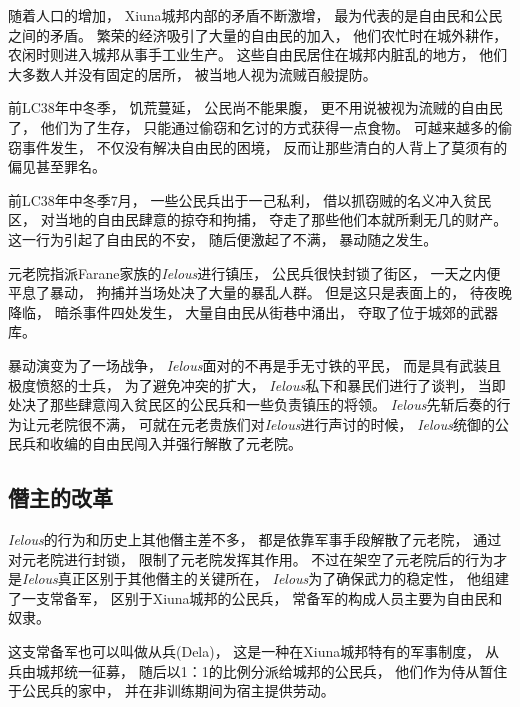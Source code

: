 \documentclass[12pt, a4paper]{ctexart}
\begin{document}
        随着人口的增加，
        Xiuna城邦内部的矛盾不断激增，
        最为代表的是自由民和公民之间的矛盾。
        繁荣的经济吸引了大量的自由民的加入，
        他们农忙时在城外耕作，
        农闲时则进入城邦从事手工业生产。
        这些自由民居住在城邦内脏乱的地方，
        他们大多数人并没有固定的居所，
        被当地人视为流贼百般提防。

        前LC38年中冬季，
        饥荒蔓延，
        公民尚不能果腹，
        更不用说被视为流贼的自由民了，
        他们为了生存，
        只能通过偷窃和乞讨的方式获得一点食物。
        可越来越多的偷窃事件发生，
        不仅没有解决自由民的困境，
        反而让那些清白的人背上了莫须有的偏见甚至罪名。

        前LC38年中冬季7月，
        一些公民兵出于一己私利，
        借以抓窃贼的名义冲入贫民区，
        对当地的自由民肆意的掠夺和拘捕，
        夺走了那些他们本就所剩无几的财产。
        这一行为引起了自由民的不安，
        随后便激起了不满，
        暴动随之发生。

        元老院指派Farane家族的\emph{Ielous}进行镇压，
        公民兵很快封锁了街区，
        一天之内便平息了暴动，
        拘捕并当场处决了大量的暴乱人群。
        但是这只是表面上的，
        待夜晚降临，
        暗杀事件四处发生，
        大量自由民从街巷中涌出，
        夺取了位于城郊的武器库。

        暴动演变为了一场战争，
        \emph{Ielous}面对的不再是手无寸铁的平民，
        而是具有武装且极度愤怒的士兵，
        为了避免冲突的扩大，
        \emph{Ielous}私下和暴民们进行了谈判，
        当即处决了那些肆意闯入贫民区的公民兵和一些负责镇压的将领。
        \emph{Ielous}先斩后奏的行为让元老院很不满，
        可就在元老贵族们对\emph{Ielous}进行声讨的时候，
        \emph{Ielous}统御的公民兵和收编的自由民闯入并强行解散了元老院。
    \subsection{僭主的改革}
        \emph{Ielous}的行为和历史上其他僭主差不多，
        都是依靠军事手段解散了元老院，
        通过对元老院进行封锁，
        限制了元老院发挥其作用。
        不过在架空了元老院后的行为才是\emph{Ielous}真正区别于其他僭主的关键所在，
        \emph{Ielous}为了确保武力的稳定性，
        他组建了一支常备军，
        区别于Xiuna城邦的公民兵，
        常备军的构成人员主要为自由民和奴隶。

        这支常备军也可以叫做从兵(Dela)，
        这是一种在Xiuna城邦特有的军事制度，
        从兵由城邦统一征募，
        随后以1：1的比例分派给城邦的公民兵，
        他们作为侍从暂住于公民兵的家中，
        并在非训练期间为宿主提供劳动。
\end{document}
